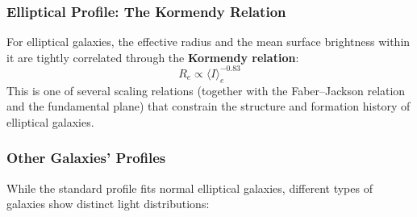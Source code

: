  
\subsubsection{Elliptical Profile: The Kormendy Relation} \label{subsec:kormendy-rel}
 
For elliptical galaxies, the effective radius and the mean surface brightness within it are tightly correlated through the \textbf{Kormendy relation}:
$$
R_e \propto \langle I \rangle_e^{-0.83}
$$
This is one of several scaling relations (together with the Faber--Jackson relation and the fundamental plane) that constrain the structure and formation history of elliptical galaxies.

\subsubsection{Other Galaxies' Profiles}

While the standard profile fits normal elliptical galaxies, different types of galaxies show distinct light distributions:

